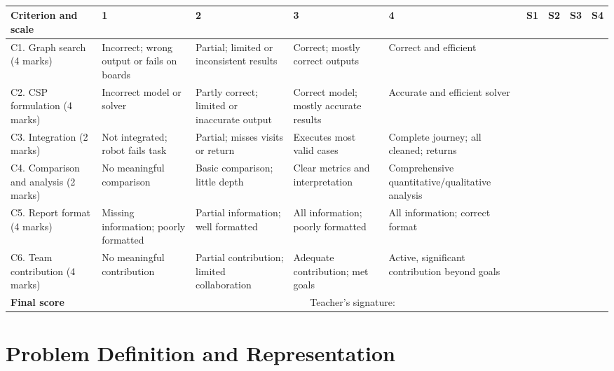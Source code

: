 \documentclass[11pt,a4paper]{article}
\begin{document}
\vspace{4mm}
\\[1mm]
\footnotesize
\setlength{\tabcolsep}{2pt}
\begin{longtable}{|p{3.3cm}|p{2.0cm}|p{2.0cm}|p{2.0cm}|p{2.0cm}|p{0.8cm}|p{0.8cm}|p{0.8cm}|p{0.8cm}|}
\hline
\bfseries Criterion and scale & \bfseries 1 & \bfseries 2 & \bfseries 3 & \bfseries 4
& \bfseries S1 & \bfseries S2 & \bfseries S3 & \bfseries S4 \\
\hline
\endhead
C1. Graph search (4 marks) &
Incorrect; wrong output or fails on boards &
Partial; limited or inconsistent results &
Correct; mostly correct outputs &
Correct and efficient &
& & & \\ \hline
C2. CSP formulation (4 marks) &
Incorrect model or solver &
Partly correct; limited or inaccurate output &
Correct model; mostly accurate results &
Accurate and efficient solver &
& & & \\ \hline
C3. Integration (2 marks) &
Not integrated; robot fails task &
Partial; misses visits or return &
Executes most valid cases &
Complete journey; all cleaned; returns &
& & & \\ \hline
C4. Comparison and analysis (2 marks) &
No meaningful comparison &
Basic comparison; little depth &
Clear metrics and interpretation &
Comprehensive quantitative/qualitative analysis &
& & & \\ \hline
C5. Report format (4 marks) &
Missing information; poorly formatted &
Partial information; well formatted &
All information; poorly formatted &
All information; correct format &
& & & \\ \hline
C6. Team contribution (4 marks) &
No meaningful contribution &
Partial contribution; limited collaboration &
Adequate contribution; met goals &
Active, significant contribution beyond goals &
& & & \\ \hline
\bfseries Final score & \multicolumn{8}{c|}{
\hspace{1cm} Teacher's signature: \underline{\hspace{5cm}} } \\
\hline
\end{longtable}
\normalsize

\newpage

\section{Problem Definition and Representation}
\end{document}
